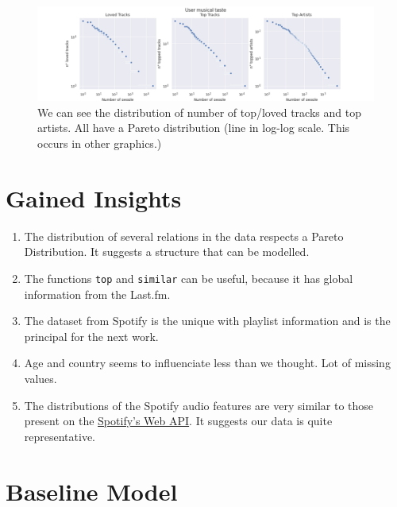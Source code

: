 \documentclass{article}
\begin{document}
\begin{figure}[!h]
  \centering
  \label{fig:top-loved}
  \includegraphics[width = \textwidth]{../../images/top-loved-tracks.png}
  \caption{We can see the distribution of number of top/loved tracks and top artists. All have a Pareto distribution (line in log-log scale. This occurs in other graphics.)}
\end{figure}

\section{Gained Insights}

\begin{enumerate}
  \item The distribution of several relations in the data respects a Pareto
  Distribution. It suggests a structure that can be modelled. 
  \item The functions \lstinline{top} and \lstinline{similar} can be useful,
  because it has global information from the Last.fm. 
  \item The dataset from Spotify is the unique with playlist information and
  is the principal for the next work. 
  \item Age and country seems to influenciate less than we thought. Lot of
  missing values.
  \item The distributions of the Spotify audio features are very similar to those
  present on the
  \href{https://developer.spotify.com/documentation/web-api/reference/tracks/get-audio-features/}{Spotify's Web API}.
  It suggests our data is quite representative.
\end{enumerate}

\section{Baseline Model}
\end{document}
